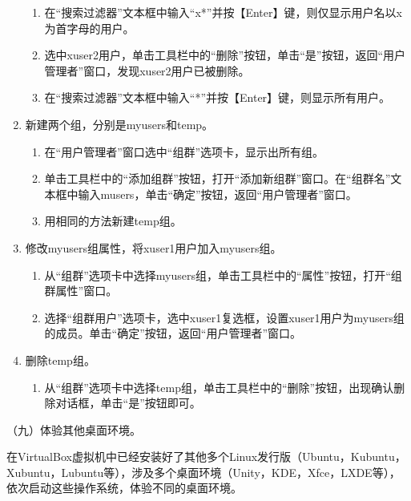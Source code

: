 \begin{enumerate}
\begin{enumerate}
      \item 在“搜索过滤器”文本框中输入“x*”并按【Enter】键，则仅显示用户名以x为首字母的用户。
      \item 选中xuser2用户，单击工具栏中的“删除”按钮，单击“是”按钮，返回“用户管理者”窗口，发现xuser2用户已被删除。
      \item 在“搜索过滤器”文本框中输入“*”并按【Enter】键，则显示所有用户。
    \end{enumerate}
  \item 新建两个组，分别是myusers和temp。
    \begin{enumerate}
      \item 在“用户管理者”窗口选中“组群”选项卡，显示出所有组。
      \item 单击工具栏中的“添加组群”按钮，打开“添加新组群”窗口。在“组群名”文本框中输入musers，单击“确定”按钮，返回“用户管理者”窗口。
      \item 用相同的方法新建temp组。
    \end{enumerate}
  \item 修改myusers组属性，将xuser1用户加入myusers组。
    \begin{enumerate}
      \item 从“组群”选项卡中选择myusers组，单击工具栏中的“属性”按钮，打开“组群属性”窗口。
      \item 选择“组群用户”选项卡，选中xuser1复选框，设置xuser1用户为myusers组的成员。单击“确定”按钮，返回“用户管理者”窗口。
    \end{enumerate}
  \item 删除temp组。
    \begin{enumerate}
      \item 从“组群”选项卡中选择temp组，单击工具栏中的“删除”按钮，出现确认删除对话框，单击“是”按钮即可。
    \end{enumerate}
\end{enumerate}

\vspace{0.1in}
（九）体验其他桌面环境。

在VirtualBox虚拟机中已经安装好了其他多个Linux发行版（Ubuntu，Kubuntu，Xubuntu，Lubuntu等），涉及多个桌面环境（Unity，KDE，Xfce，LXDE等），依次启动这些操作系统，体验不同的桌面环境。
